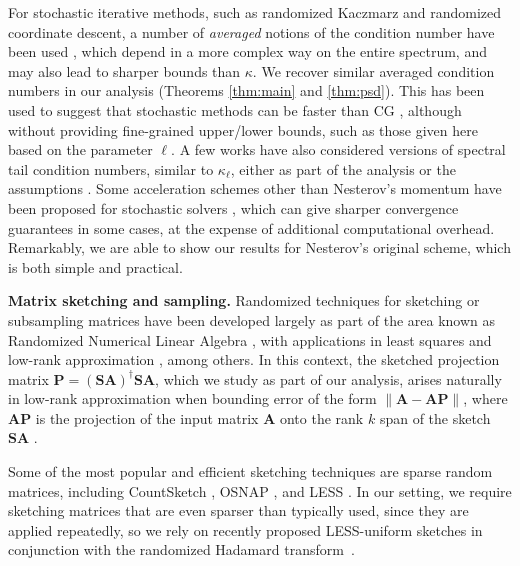 \documentclass[11pt]{article}
\def\A{{\mathbf A}}
\def\S{{\mathbf S}}
\def\P{{\mathbf P}}
\begin{document}
For stochastic iterative methods, such as randomized Kaczmarz and randomized coordinate descent, a number of \emph{averaged} notions of the condition number have been used \cite{SV09:Randomized-Kaczmarz,leventhal2010randomized,liu2016accelerated,bollapragada2024fast}, which depend in a more complex way on the entire spectrum, and may also lead to sharper bounds than $\kappa$. We recover similar averaged condition numbers in our analysis (Theorems \ref{thm:main} and \ref{thm:psd}). This has been used to suggest that stochastic methods can be faster than CG \cite{lee2013efficient}, although without providing fine-grained upper/lower bounds, such as those given here based on the parameter $\ell$.
A few works have also considered versions of spectral tail condition numbers, similar to $\kappa_\ell$, either as part of the analysis \cite{gonen2016solving,musco2018spectrum} or the assumptions \cite{derezinski2023solving}. Some acceleration schemes other than Nesterov's momentum have been proposed for stochastic solvers \cite{lin2015universal,frostig2015regularizing,allen2018katyusha,bollapragada2024fast, alderman2024randomized}, which can give sharper convergence guarantees in some cases, at the expense of additional computational overhead. Remarkably, we are able to show our results for Nesterov's original scheme, which is both simple and practical.

\smallskip

\noindent
\textbf{Matrix sketching and sampling.} Randomized techniques for sketching or subsampling matrices have been developed largely as part of the area known as Randomized Numerical Linear Algebra \cite{woodruff2014sketching,drineas2016randnla,martinsson2020randomized,derezinski2024recent}, with applications in least squares \cite{sarlos2006improved,rokhlin2008fast} and low-rank approximation \cite{cohen2015dimensionality,cohen2017input}, among others. In this context, the sketched projection matrix $\P=(\S\A)^\dagger\S\A$, which we study as part of our analysis, arises naturally in low-rank approximation when bounding error of the form $\|\A - \A\P\|$, where $\A\P$ is the projection of the input matrix $\A$ onto the rank $k$ span of the sketch $\S\A$ \cite{halko2011finding}. 

Some of the most popular and efficient sketching techniques are sparse random matrices, including CountSketch \cite{charikar2004finding}, OSNAP \cite{nelson2013osnap}, and LESS \cite{derezinski2021sparse}. In our setting, we require sketching matrices that are even sparser than typically used, since they are applied repeatedly, so we rely on recently proposed LESS-uniform sketches \cite{derezinski2021newton,chenakkod2023optimal} in conjunction with the randomized Hadamard transform~\cite{ailon2009fast,tropp2011improved}. 
\end{document}
